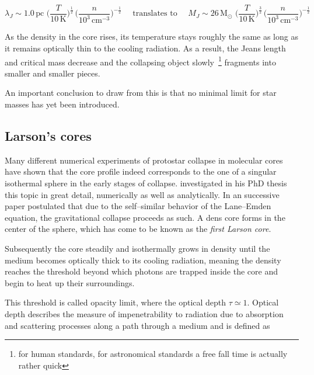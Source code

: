 \begin{equation*}
  \lambda_{J} \sim 1.0\,\text{pc}\,\,\big(\frac{T}{10\,\text{K}}\big)^{\frac{1}{2}}\,\big(\frac{n}{10^{3}\,\text{cm}^{-3}}\big)^{-\frac{1}{2}} \quad\text{ translates to }\quad M_{J} \sim 26\,\text{M}_{\odot}\,\,\big(\frac{T}{10\,\text{K}}\big)^{\frac{3}{2}}\,\big(\frac{n}{10^{3}\,\text{cm}^{-3}}\big)^{-\frac{1}{2}}
\end{equation*}

As the density in the core rises, its temperature stays roughly the same as long as it remains optically thin to the cooling radiation.
As a result, the Jeans length and critical mass decrease and the collapsing object slowly~\footnote{for human standards, for astronomical standards a free fall time is actually rather quick} fragments into smaller and smaller pieces.

An important conclusion to draw from this is that no minimal limit for star masses has yet been introduced.

\subsection{Larson's cores}
\label{subsec:Larson_cores}

Many different numerical experiments of protostar collapse in molecular cores have shown that the core profile indeed corresponds to the one of a singular isothermal sphere in the early stages of collapse.
\citet{Larson_thesis} investigated in his PhD thesis this topic in great detail, numerically as well as analytically.
In an successive paper \citet{Larson_paper} postulated that due to the self--similar behavior of the Lane--Emden equation, the gravitational collapse proceeds as such.
A dens core forms in the center of the sphere, which has come to be known as the \textit{first Larson core}.

Subsequently the core steadily and isothermally grows in density until the medium becomes optically thick to its cooling radiation, meaning the density reaches the threshold beyond which photons are trapped inside the core and begin to heat up their surroundings.

This threshold is called opacity limit, where the optical depth $\tau \simeq 1$.
Optical depth describes the measure of impenetrability to radiation due to absorption and scattering processes along a path through a medium and is defined as

